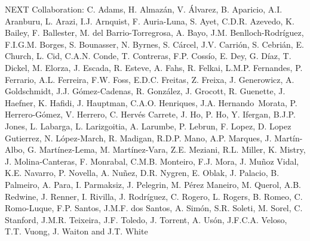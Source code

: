 NEXT Collaboration: C. Adams, H. Almaz\'an, V. \'Alvarez, B. Aparicio, A.I. Aranburu, L. Arazi, I.J. Arnquist, F. Auria-Luna, S. Ayet, C.D.R. Azevedo, K. Bailey, F. Ballester, M. del Barrio-Torregrosa, A. Bayo, J.M. Benlloch-Rodr\'{i}guez, F.I.G.M. Borges, S. Bounasser, N. Byrnes, S. C\'arcel, J.V. Carri\'on, S. Cebri\'an, E. Church, L. Cid, C.A.N. Conde, T. Contreras, F.P. Coss\'io, E. Dey, G. D\'iaz, T. Dickel, M. Elorza, J. Escada, R. Esteve, A. Fahs, R. Felkai, L.M.P. Fernandes, P. Ferrario, A.L. Ferreira, F.W. Foss, E.D.C. Freitas, Z. Freixa, J. Generowicz, A. Goldschmidt, J.J. G\'omez-Cadenas, R. Gonz\'alez, J. Grocott, R. Guenette, J. Haefner, K. Hafidi, J. Hauptman, C.A.O. Henriques, J.A. Hernando~Morata, P. Herrero-G\'omez, V. Herrero, C. Herv\'es Carrete, J. Ho, P. Ho, Y. Ifergan, B.J.P. Jones, L. Labarga, L. Larizgoitia, A. Larumbe, P. Lebrun, F. Lopez, D. Lopez Gutierrez, N. L\'opez-March, R. Madigan, R.D.P. Mano, A.P. Marques, J. Mart\'in-Albo, G. Mart\'inez-Lema, M. Mart\'inez-Vara, Z.E. Meziani, R.L. Miller, K. Mistry, J. Molina-Canteras, F. Monrabal, C.M.B. Monteiro, F.J. Mora, J. Mu\~noz Vidal, K.E. Navarro, P. Novella, A. Nu\~{n}ez, D.R. Nygren, E. Oblak, J. Palacio, B. Palmeiro, A. Para, I. Parmaksiz, J. Pelegrin, M. P\'erez Maneiro, M. Querol, A.B. Redwine, J. Renner, I. Rivilla, J. Rodr\'iguez, C. Rogero, L. Rogers, B. Romeo, C. Romo-Luque, F.P. Santos, J.M.F. dos Santos, A. Sim\'on, S.R. Soleti, M. Sorel, C. Stanford, J.M.R. Teixeira, J.F. Toledo, J. Torrent, A. Us\'on, J.F.C.A. Veloso, T.T. Vuong, J. Waiton and J.T. White